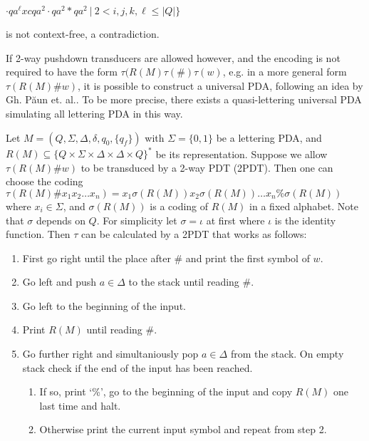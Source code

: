 \documentclass{eptcs}
\begin{document}
\hspace{1.2cm}$\cdot qa^{\ell}xcqa^2\cdot qa^2*qa^2\ |\ 2<i,j,k,\ell\leq |Q|\}$

is not context-free, a contradiction.

\bigskip

If 2-way pushdown transducers are allowed however, and the encoding is not required to
have the form $\tau(R(M)\tau(\#)\tau(w)$,
e.g. in a more general form $\tau(R(M){\#}w)$,
 it is possible to construct a universal PDA,
following an idea by Gh. P\u{a}un et. al.. To be more precise, there exists a
quasi-lettering universal PDA simulating all lettering PDA
in this way.


\medskip
Let $M=(Q,\Sigma,\Delta,\delta,q_0,\{q_f\})$ with $\Sigma=\{0,1\}$
be a lettering PDA, and 
$R(M)\subseteq \{Q\times \Sigma\times
\Delta\times \Delta\times Q\}^* $
be its representation.
Suppose we allow $\tau(R(M)\# w)$ to be transduced by a 2-way PDT
 (2PDT).
Then one can choose the coding
$\tau(R(M)\# x_1x_2\dots x_n)=x_1 \sigma(R(M)) x_2 \sigma(R(M))
 \dots x_n \% \sigma(R(M))$
where $x_i\in\Sigma$, and $\sigma(R(M))$ is a coding of $R(M)$ in a fixed alphabet.
Note that $\sigma$ depends on $Q$. 
For simplicity let $\sigma=\iota$ at first where $\iota$ is the
identity function. Then $\tau$ can be 
calculated by a 2PDT that works as follows:
\begin{enumerate}

	\item First go right until the place after \# and print the first symbol of $w$.

	\item Go left and push $a\in\Delta$ to the stack until reading \#.

	\item Go left to the beginning of the input. 

	\item Print $R(M)$ until reading \#.
	
	\item Go further right and simultaniously pop $a\in\Delta$ from the stack.
On empty stack check if the end of the input has been reached.
	
	\begin{enumerate}
		\item If so, print `\%', go to the beginning of the input and copy $R(M)$ one last time and halt.
		\item Otherwise print the current input symbol and repeat from step 2.
	\end{enumerate}
\end{enumerate}
\end{document}
